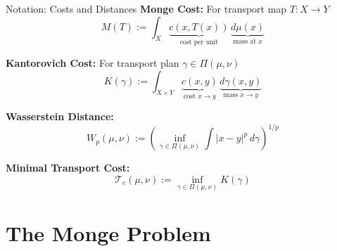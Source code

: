 \documentclass[aspectratio=169]{beamer}
\begin{document}
\begin{frame}{Notation: Costs and Distances}
\textbf{Monge Cost:} For transport map $T: X \to Y$
\[
M(T) := \int_X \underbrace{c(x, T(x))}_{\text{cost per unit}} \, \underbrace{d\mu(x)}_{\text{mass at } x}
\]

\vspace{0.3cm}
\textbf{Kantorovich Cost:} For transport plan $\gamma \in \Pi(\mu,\nu)$
\[
K(\gamma) := \int_{X \times Y} \underbrace{c(x,y)}_{\text{cost } x \to y} \, \underbrace{d\gamma(x,y)}_{\text{mass } x \to y}
\]

\vspace{0.3cm}
\textbf{Wasserstein Distance:}
\[
W_p(\mu,\nu) := \left( \inf_{\gamma \in \Pi(\mu,\nu)} \int |x-y|^p \, d\gamma \right)^{1/p}
\]

\vspace{0.2cm}
\textbf{Minimal Transport Cost:}
\[
\mathcal{T}_c(\mu,\nu) := \inf_{\gamma \in \Pi(\mu,\nu)} K(\gamma)
\]
\end{frame}

\section{The Monge Problem}
\end{document}
